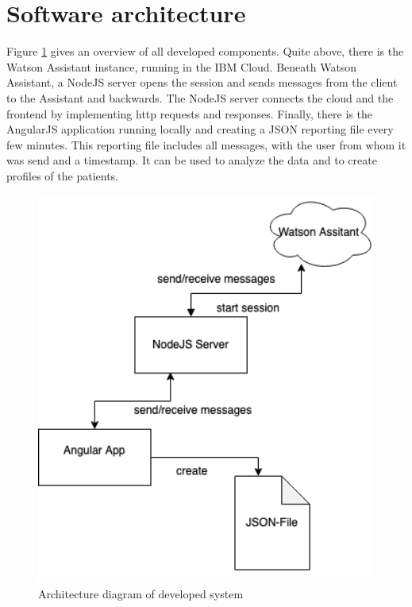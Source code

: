 \section{Software architecture}

Figure \ref{architecture_0102} gives an overview of all developed components. Quite above, there is the Watson Assistant instance, running in the IBM Cloud. Beneath Watson Assistant, a NodeJS server opens the session and sends messages from the client to the Assistant and backwards. The NodeJS server connects the cloud and the frontend by implementing \ac{http} requests and responses. Finally, there is the AngularJS application running locally and creating a \ac{JSON} reporting file every few minutes. This reporting file includes all messages, with the user from whom it was send and a timestamp. It can be used to analyze the data and to create profiles of the patients.

\begin{figure}[ht]
	\centering
	\includegraphics[width=1\textwidth]{images/architecture_0102.png}
	\caption{Architecture diagram of developed system}
	\label{architecture_0102}
\end{figure}

